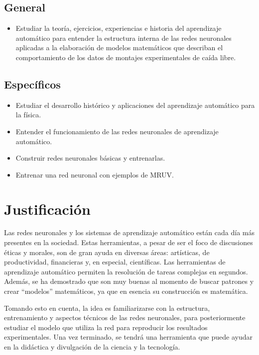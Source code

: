 \documentclass[titlepage,11pt]{article}
\begin{document}
\subsection{General}
\label{sec:general}
\begin{itemize}
\item Estudiar la teoría, ejercicios, experiencias e historia del aprendizaje
  automático para entender la estructura interna de las redes neuronales
  aplicadas a la elaboración de modelos matemáticos que describan el
  comportamiento de los datos de montajes experimentales de caída libre.
\end{itemize}

\subsection{Específicos}
\label{sec:especificos}
\begin{itemize}
\item Estudiar el desarrollo histórico y aplicaciones del aprendizaje
  automático para la física.
\item Entender el funcionamiento de las redes neuronales de aprendizaje
  automático.
\item Construir redes neuronales básicas y entrenarlas.
\item Entrenar una red neuronal con ejemplos de MRUV.
\end{itemize}


\section{Justificación}
\label{sec:justificacion}
Las redes neuronales y los sistemas de aprendizaje automático están cada día
más presentes en la sociedad. Estas herramientas, a pesar de ser el foco de
discusiones éticas y morales, son de gran ayuda en diversas áreas: artísticas,
de productividad, financieras y, en especial, científicas. Las herramientas de
aprendizaje automático permiten la resolución de tareas complejas en segundos.
Además, se ha demostrado que son muy buenas al momento de buscar patrones y
crear \enquote{modelos} matemáticos, ya que en esencia su construcción es
matemática.

Tomando esto en cuenta, la idea es familiarizarse con la estructura,
entrenamiento y aspectos técnicos de las redes neuronales, para posteriormente
estudiar el modelo que utiliza la red para reproducir los resultados
experimentales. Una vez terminado, se tendrá una herramienta que puede ayudar
en la didáctica y divulgación de la ciencia y la tecnología.
\end{document}
